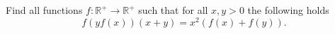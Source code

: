 Find all functions $f\colon\mathbb{R}^+ \rightarrow \mathbb{R}^+$ such that
for all $x,y>0$ the following holds
$$f(yf(x))(x+y)=x^2(f(x)+f(y)).$$